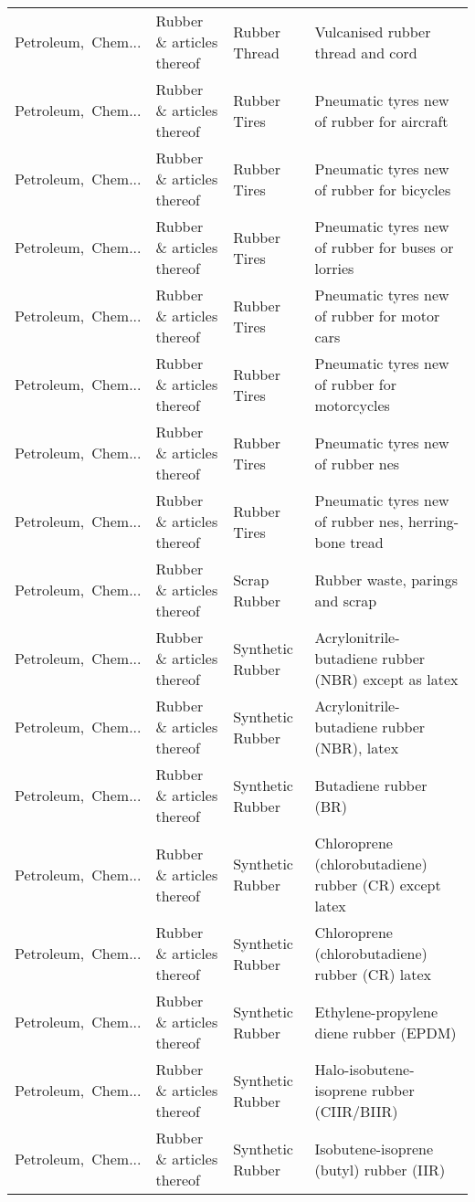 \begin{appendices}
\begin{xltabular}{\textwidth}{|p{0.10\textwidth}|p{0.25\textwidth}|p{0.24\textwidth}|p{0.31\textwidth}|}
Petroleum,\ Chem... & Rubber \& articles thereof & Rubber Thread & Vulcanised rubber thread and cord \\
Petroleum,\ Chem... & Rubber \& articles thereof & Rubber Tires & Pneumatic tyres new of rubber for aircraft \\
Petroleum,\ Chem... & Rubber \& articles thereof & Rubber Tires & Pneumatic tyres new of rubber for bicycles \\
Petroleum,\ Chem... & Rubber \& articles thereof & Rubber Tires & Pneumatic tyres new of rubber for buses or lorries \\
Petroleum,\ Chem... & Rubber \& articles thereof & Rubber Tires & Pneumatic tyres new of rubber for motor cars \\
Petroleum,\ Chem... & Rubber \& articles thereof & Rubber Tires & Pneumatic tyres new of rubber for motorcycles \\
Petroleum,\ Chem... & Rubber \& articles thereof & Rubber Tires & Pneumatic tyres new of rubber nes \\
Petroleum,\ Chem... & Rubber \& articles thereof & Rubber Tires & Pneumatic tyres new of rubber nes, herring-bone tread \\
Petroleum,\ Chem... & Rubber \& articles thereof & Scrap Rubber & Rubber waste, parings and scrap \\
Petroleum,\ Chem... & Rubber \& articles thereof & Synthetic Rubber & Acrylonitrile-butadiene rubber (NBR) except as latex \\
Petroleum,\ Chem... & Rubber \& articles thereof & Synthetic Rubber & Acrylonitrile-butadiene rubber (NBR), latex \\
Petroleum,\ Chem... & Rubber \& articles thereof & Synthetic Rubber & Butadiene rubber (BR) \\
Petroleum,\ Chem... & Rubber \& articles thereof & Synthetic Rubber & Chloroprene (chlorobutadiene) rubber (CR) except latex \\
Petroleum,\ Chem... & Rubber \& articles thereof & Synthetic Rubber & Chloroprene (chlorobutadiene) rubber (CR) latex \\
Petroleum,\ Chem... & Rubber \& articles thereof & Synthetic Rubber & Ethylene-propylene diene rubber (EPDM) \\
Petroleum,\ Chem... & Rubber \& articles thereof & Synthetic Rubber & Halo-isobutene-isoprene rubber (CIIR/BIIR) \\
Petroleum,\ Chem... & Rubber \& articles thereof & Synthetic Rubber & Isobutene-isoprene (butyl) rubber (IIR) \\

\end{xltabular}
\end{appendices}
